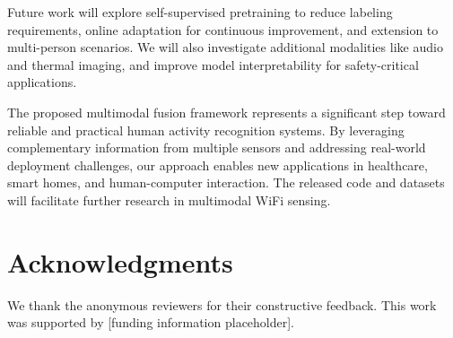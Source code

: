 \documentclass[journal]{IEEEtran}
\begin{document}
Future work will explore self-supervised pretraining to reduce labeling requirements, online adaptation for continuous improvement, and extension to multi-person scenarios. We will also investigate additional modalities like audio and thermal imaging, and improve model interpretability for safety-critical applications.

The proposed multimodal fusion framework represents a significant step toward reliable and practical human activity recognition systems. By leveraging complementary information from multiple sensors and addressing real-world deployment challenges, our approach enables new applications in healthcare, smart homes, and human-computer interaction. The released code and datasets will facilitate further research in multimodal WiFi sensing.

\section*{Acknowledgments}

We thank the anonymous reviewers for their constructive feedback. This work was supported by [funding information placeholder].



\end{document}
